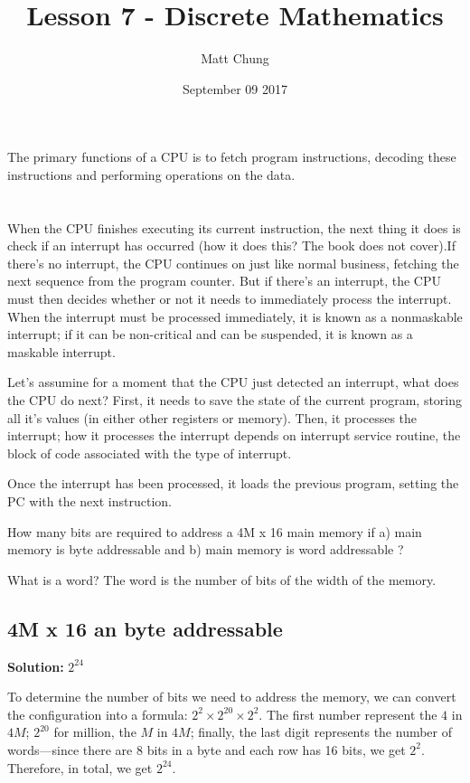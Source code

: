 \documentclass{article}
\title{Lesson 7 - Discrete Mathematics}
\author{Matt Chung}
\date{September 09 2017}
\begin{document}
\maketitle

\section{}
The primary functions of a CPU is to fetch program instructions, decoding these instructions and performing operations on the data.

\section{}
When the CPU finishes executing its current instruction, the next thing it does is check if an interrupt has occurred (how it does this? The book does not cover).If there's no interrupt, the CPU continues on just like normal business, fetching the next sequence from the program counter. But if there's an interrupt, the CPU must then decides whether or not it needs to immediately process the interrupt. When the interrupt must be processed immediately, it is known as a nonmaskable interrupt; if it can be non-critical and can be suspended, it is known as a maskable interrupt.

Let's assumine for a moment that the CPU just detected an interrupt, what does the CPU do next? First, it needs to save the state of the current program, storing all it's values (in either other registers or memory). Then, it processes the interrupt; how it processes the interrupt depends on interrupt service routine, the block of code associated with the type of interrupt.

Once the interrupt has been processed, it loads the previous program, setting the PC with the next instruction.

How many bits are required to address a 4M x 16 main memory if a) main memory is byte addressable and b) main memory is word addressable ?

What is a word? The word is the number of bits of the width of the memory.

\subsection{4M x 16 an byte addressable}

\textbf{Solution:} $2^{24}$

To determine the number of bits we need to address the memory, we can convert the configuration into a formula: $2^{2} \times 2^{20} \times 2^2$. The first number represent the $4$ in $4M$; $2^{20}$ for million, the $M$ in $4M$; finally, the last digit represents the number of words—since there are 8 bits in a byte and each row has 16 bits, we get $2^2$. Therefore, in total, we get $2^24$.
\end{document}
